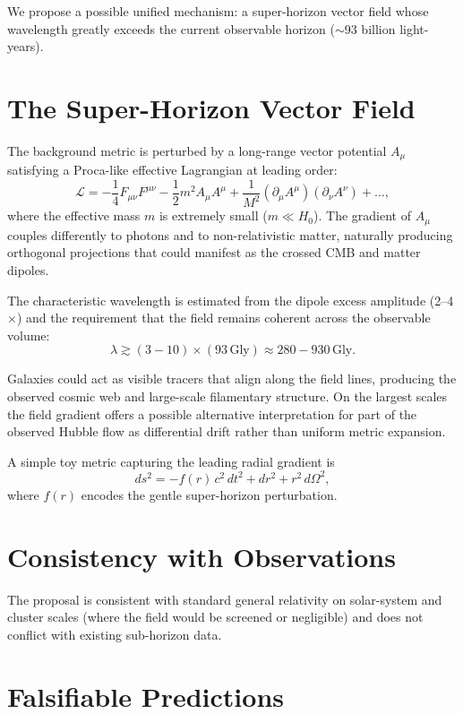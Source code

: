\documentclass[11pt,a4paper]{article}
\begin{document}
We propose a possible unified mechanism: a super-horizon vector field whose wavelength greatly exceeds the current observable horizon ($\sim$93 billion light-years).

\section{The Super-Horizon Vector Field}

The background metric is perturbed by a long-range vector potential $A_\mu$ satisfying a Proca-like effective Lagrangian at leading order:
\[
\mathcal{L} = -\frac{1}{4} F_{\mu\nu} F^{\mu\nu} - \frac{1}{2} m^2 A_\mu A^\mu + \frac{1}{M^2} (\partial_\mu A^\mu)(\partial_\nu A^\nu) + \dots,
\]
where the effective mass $m$ is extremely small ($m \ll H_0$). The gradient of $A_\mu$ couples differently to photons and to non-relativistic matter, naturally producing orthogonal projections that could manifest as the crossed CMB and matter dipoles.

The characteristic wavelength is estimated from the dipole excess amplitude (2--4$\times$) and the requirement that the field remains coherent across the observable volume:
\[
\lambda \gtrsim (3-10) \times (93\,\text{Gly}) \approx 280-930\,\text{Gly}.
\]

Galaxies could act as visible tracers that align along the field lines, producing the observed cosmic web and large-scale filamentary structure. On the largest scales the field gradient offers a possible alternative interpretation for part of the observed Hubble flow as differential drift rather than uniform metric expansion.

A simple toy metric capturing the leading radial gradient is
\[
ds^2 = -f(r)\,c^2\,dt^2 + dr^2 + r^2\,d\Omega^2,
\]
where $f(r)$ encodes the gentle super-horizon perturbation.

\section{Consistency with Observations}

The proposal is consistent with standard general relativity on solar-system and cluster scales (where the field would be screened or negligible) and does not conflict with existing sub-horizon data.

\section{Falsifiable Predictions}
\end{document}
